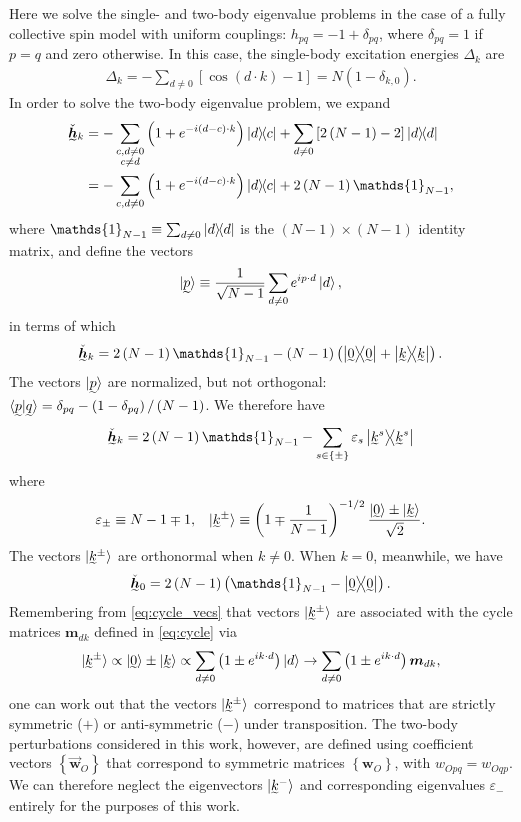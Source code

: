 \documentclass[nofootinbib,notitlepage,11pt]{revtex4-2}
\newcommand{\f}[2]{\dfrac{#1}{#2}} %
\newcommand{\p}[1]{\left(#1\right)} %
\renewcommand{\sp}[1]{\left[#1\right]} %
\renewcommand{\set}[1]{\left\{#1\right\}} %
\renewcommand{\c}{\cdot} %
\newcommand{\m}{\bm} %
\renewcommand{\v}{\vec} %
\newcommand{\1}{\mathds{1}}
\newcommand{\ut}{\undertilde}
\begin{document}
Here we solve the single- and two-body eigenvalue problems in the case
of a fully collective spin model with uniform couplings:
$h_{pq}=-1+\delta_{pq}$, where $\delta_{pq}=1$ if $p=q$ and zero
otherwise.  In this case, the single-body excitation energies
$\Delta_k$ are
\begin{align}
  \Delta_k
  = - \sum_{d\ne 0} \sp{\cos\p{d\c k}-1}
  = N \p{1-\delta_{k,0}}.
\end{align}
In order to solve the two-body eigenvalue problem, we expand
\begin{align}
  \ut{\check{\m h}}_k
  &= -\sum_{\substack{c,d\ne0\\c\ne d}}
  \p{1+e^{-i\p{d-c}\c k}} \op{d}{c}
  + \sum_{d\ne0} \sp{2\p{N-1}-2} \op{d} \\
  &= -\sum_{c,d\ne0} \p{1+e^{-i\p{d-c}\c k}} \op{d}{c}
  + 2\p{N-1} \1_{N-1},
\end{align}
where $\1_{N-1}\equiv\sum_{d\ne0}\op{d}$ is the $\p{N-1}\times\p{N-1}$
identity matrix, and define the vectors
\begin{align}
  \ket{\ut{p}}
  \equiv \f1{\sqrt{N-1}} \sum_{d\ne 0} e^{i p\c d}\ket{d},
\end{align}
in terms of which
\begin{align}
  \ut{\check{\m h}}_k
  = 2 \p{N-1} \1_{N-1} - \p{N-1} \p{\op{\ut{0}} + \op{\ut{k}}}.
\end{align}
The vectors $\ket{\ut{p}}$ are normalized, but not orthogonal:
$\braket{\ut{p}|\ut{q}}=\delta_{pq}-\p{1-\delta_{pq}}/\p{N-1}$.  We
therefore have
\begin{align}
  \ut{\check{\m h}}_k
  = 2 \p{N-1} \1_{N-1}
  - \sum_{s\in\set{\pm}} \varepsilon_s \op{\ut{k}^s}
\end{align}
where
\begin{align}
  \varepsilon_\pm \equiv N - 1 \mp 1,
  &&
  \ket{\ut{k}^\pm}
  \equiv \p{1\mp\f1{N-1}}^{-1/2}
  \f{\ket{\ut{0}}\pm\ket{\ut{k}}}{\sqrt{2}}.
\end{align}
The vectors $\ket{\ut{k}^\pm}$ are orthonormal when $k\ne0$.  When
$k=0$, meanwhile, we have
\begin{align}
  \ut{\check{\m h}}_0 = 2\p{N-1} \p{\1_{N-1} - \op{\ut{0}}}.
\end{align}
Remembering from \eqref{eq:cycle_vecs} that vectors $\ket{\ut{k}^\pm}$
are associated with the cycle matrices $\m m_{dk}$ defined in
\eqref{eq:cycle} via
\begin{align}
  \ket{\ut{k}^\pm}
  \propto \ket{\ut{0}} \pm \ket{\ut{k}}
  \propto \sum_{d\ne0} \p{1 \pm e^{ik\c d}} \ket{d}
  \to \sum_{d\ne0} \p{1 \pm e^{ik\c d}} \m m_{dk},
\end{align}
one can work out that the vectors $\ket{\ut{k}^\pm}$ correspond to
matrices that are strictly symmetric ($+$) or anti-symmetric ($-$)
under transposition.  The two-body perturbations considered in this
work, however, are defined using coefficient vectors
$\set{\v{\m w}_O}$ that correspond to symmetric matrices
$\set{\m w_O}$, with $w_{Opq}=w_{Oqp}$.  We can therefore neglect the
eigenvectors $\ket{\ut{k}^-}$ and corresponding eigenvalues
$\varepsilon_-$ entirely for the purposes of this work.
\end{document}
